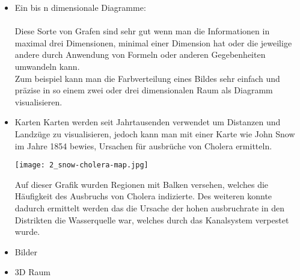 \begin{itemize}
\begin{itemize}
        \end{itemize}
    \newpage
    \item{Ein bis n dimensionale Diagramme:} \\ \\
        Diese Sorte von Grafen sind sehr gut wenn man die Informationen in maximal drei Dimensionen, minimal einer Dimension hat oder die
        jeweilige andere durch Anwendung von Formeln oder anderen Gegebenheiten umwandeln kann. \\
        Zum beispiel kann man die Farbverteilung eines Bildes sehr einfach und präzise in so einem zwei oder drei dimensionalen Raum als
        Diagramm visualisieren.
        \begin{center}
        \end{center}
    \item{Karten}
        Karten werden seit Jahrtausenden verwendet um Distanzen und Landzüge zu visualisieren, jedoch kann man mit einer Karte wie John Snow
        im Jahre 1854 bewies, Ursachen für ausbrüche von Cholera ermitteln.\cite{bestvisualizations}
        \begin{center}
            \texttt{[image: 2\_snow-cholera-map.jpg]}\cite{choleramap}
        \end{center}
        Auf dieser Grafik wurden Regionen mit Balken versehen, welches die Häufigkeit des Ausbruchs von Cholera indizierte. Des weiteren
        konnte dadurch ermittelt werden das die Ursache der hohen ausbruchrate in den Distrikten die Wasserquelle war, welches durch das
        Kanalsystem verpestet wurde.\cite{bestvisualizations}
    \item{Bilder}
    \item{3D Raum}
\end{itemize}

